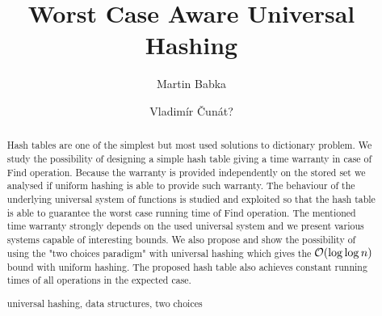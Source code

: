 \documentclass[runningheads,a4paper]{llncs}
\newcommand{\keywords}[1]{\par\addvspace\baselineskip
\noindent\keywordname\enspace\ignorespaces#1}
\begin{document}
\mainmatter

\author{Martin Babka
\and Vladimír Čunát?}

\title{Worst Case Aware Universal Hashing}



\maketitle

\begin{abstract}
Hash tables are one of the simplest but most used solutions to dictionary problem. 
We study the possibility of designing a simple hash table giving a time warranty in case of Find operation.
Because the warranty is provided independently on the stored set we analysed if uniform hashing is able to provide such warranty.
The behaviour of the underlying universal system of functions is studied and exploited so that the hash table is able to guarantee the worst case running time of Find operation.
The mentioned time warranty strongly depends on the used universal system and we present various systems capable of interesting bounds. 
We also propose and show the possibility of using the "two choices paradigm" with universal hashing which gives the $\mathcal{O}(\log \log n)$ bound with uniform hashing.
The proposed hash table also achieves constant running times of all operations in the expected case.

\keywords{universal hashing, data structures, two choices}
\end{abstract}









\end{document}
